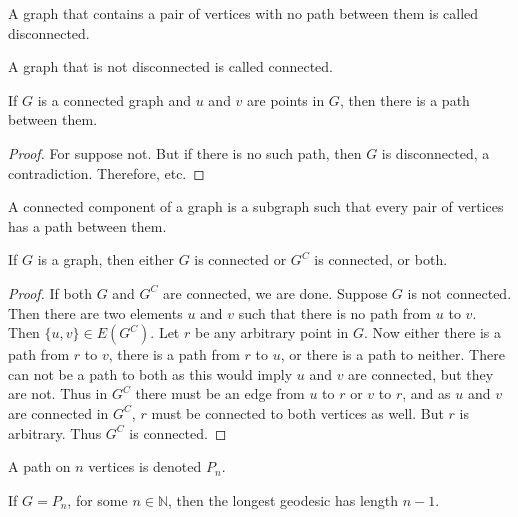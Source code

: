         \begin{definition}
        A graph that contains a pair of vertices with no path between them is called disconnected.
        \end{definition}
        \begin{definition}
        A graph that is not disconnected is called connected.
        \end{definition}
        \begin{theorem}
        If $G$ is a connected graph and $u$ and $v$ are points in $G$, then there is a path between them.
        \end{theorem}
        \begin{proof}
        For suppose not. But if there is no such path, then $G$ is disconnected, a contradiction. Therefore, etc.
        \end{proof}
        \begin{definition}
        A connected component of a graph is a subgraph such that every pair of vertices has a path between them.
        \end{definition}
        \begin{theorem}
        If $G$ is a graph, then either $G$ is connected or $G^C$ is connected, or both. 
        \end{theorem}
        \begin{proof}
        If both $G$ and $G^C$ are connected, we are done. Suppose $G$ is not connected. Then there are two elements $u$ and $v$ such that there is no path from $u$ to $v$. Then $\{u,v\}\in E(G^C)$. Let $r$ be any arbitrary point in $G$. Now either there is a path from $r$ to $v$, there is a path from $r$ to $u$, or there is a path to neither. There can not be a path to both as this would imply $u$ and $v$ are connected, but they are not. Thus in $G^C$ there must be an edge from $u$ to $r$ or $v$ to $r$, and as $u$ and $v$ are connected in $G^C$, $r$ must be connected to both vertices as well. But $r$ is arbitrary. Thus $G^C$ is connected.
        \end{proof}
        \begin{definition}
        A path on $n$ vertices is denoted $P_n$.
        \end{definition}
        \begin{theorem}
        If $G = P_n$, for some $n\in \mathbb{N}$, then the longest geodesic has length $n-1$.
        \end{theorem}
